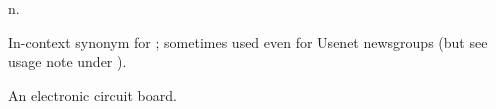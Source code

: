  n.

\begin{inparaenum}
\item In-context synonym for ; sometimes used even for Usenet
    newsgroups (but see usage note under ).
\item An electronic circuit board.
\end{inparaenum}


